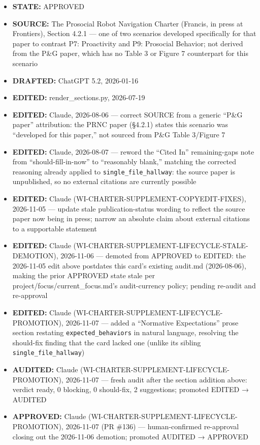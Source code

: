\documentclass[utf8]{frontiers_suppmat} %
\providecommand{\tightlist}{%
  \setlength{\itemsep}{0pt}\setlength{\parskip}{0pt}}
\begin{document}
\begin{itemize}
\tightlist
\item
  \textbf{STATE:} APPROVED
\item
  \textbf{SOURCE:} The Prosocial Robot Navigation Charter (Francis, in
  press at Frontiers), Section 4.2.1 --- one of two scenarios developed
  specifically for that paper to contrast P7: Proactivity and P9:
  Prosocial Behavior; not derived from the P\&G paper, which has no
  Table 3 or Figure 7 counterpart for this scenario
\item
  \textbf{DRAFTED:} ChatGPT 5.2, 2026-01-16
\item
  \textbf{EDITED:} render\_sections.py, 2026-07-19
\item
  \textbf{EDITED:} Claude, 2026-08-06 --- correct SOURCE from a generic
  ``P\&G paper'' attribution: the PRNC paper (§4.2.1) states this
  scenario was ``developed for this paper,'' not sourced from P\&G Table
  3/Figure 7
\item
  \textbf{EDITED:} Claude, 2026-08-07 --- reword the ``Cited In''
  remaining-gaps note from ``should-fill-in-now'' to ``reasonably
  blank,'' matching the corrected reasoning already applied to
  \texttt{single\_file\_hallway}: the source paper is
  unpublished, so no external citations are currently possible
\item
  \textbf{EDITED:} Claude (WI-CHARTER-SUPPLEMENT-COPYEDIT-FIXES),
  2026-11-05 --- update stale publication-status wording to reflect the
  source paper now being in press; narrow an absolute claim about
  external citations to a supportable statement
\item
  \textbf{EDITED:} Claude
  (WI-CHARTER-SUPPLEMENT-LIFECYCLE-STALE-DEMOTION), 2026-11-06 ---
  demoted from APPROVED to EDITED: the 2026-11-05 edit above postdates
  this card's existing audit.md (2026-08-06), making the prior APPROVED
  state stale per project/focus/current\_focus.md's audit-currency
  policy; pending re-audit and re-approval
\item
  \textbf{EDITED:} Claude (WI-CHARTER-SUPPLEMENT-LIFECYCLE-PROMOTION),
  2026-11-07 --- added a ``Normative Expectations'' prose section
  restating \texttt{expected\_behaviors} in natural
  language, resolving the should-fix finding that the card lacked one
  (unlike its sibling \texttt{single\_file\_hallway})
\item
  \textbf{AUDITED:} Claude (WI-CHARTER-SUPPLEMENT-LIFECYCLE-PROMOTION),
  2026-11-07 --- fresh audit after the section addition above: verdict
  ready, 0 blocking, 0 should-fix, 2 suggestions; promoted EDITED →
  AUDITED
\item
  \textbf{APPROVED:} Claude (WI-CHARTER-SUPPLEMENT-LIFECYCLE-PROMOTION),
  2026-11-07 (PR \#136) --- human-confirmed re-approval closing out the
  2026-11-06 demotion; promoted AUDITED → APPROVED
\end{itemize}
\end{document}
